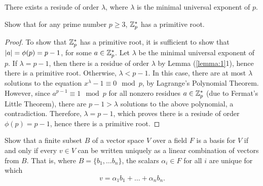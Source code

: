 \documentclass[11pt]{article}
\begin{document}
\begin{lemma}{1} \label{lemma:1}
There exists a resiude of order $ \lambda $, where $ \lambda $ is the minimal universal exponent of $ p $.
\end{lemma}

\begin{exercise}{2}
Show that for any prime number $ p \geq 3 $, $ \mathbb{Z}_{p}^{*} $ has a primitive root.
\end{exercise}

\begin{proof}
To show that $ \mathbb{Z}_{p}^{*} $ has a primitive root, it is sufficient to show that $ |a| = \phi(p) = p-1 $, for some $ a \in \mathbb{Z}_{p}^{*} $. Let $ \lambda $ be the minimal universal exponent of $ p $. If $ \lambda = p-1 $, then there is a residue of order $ \lambda $ by Lemma (\ref{lemma:1}1), hence there is a primitive root. Otherwise, $ \lambda < p-1 $. In this case, there are at most $ \lambda $ solutions to the equation $ x^{\lambda} - 1 \equiv 0 \mod p$, by Lagrange's Polynomial Theorem. However, since $ a^{p-1} \equiv 1 \mod p $ for all nonzero residues $ a \in \mathbb{Z}_{p}^{*} $ (due to Fermat's Little Theorem), there are $ p-1 > \lambda$ solutions to the above polynomial, a contradiction. Therefore, $ \lambda = p - 1 $, which proves there is a resiude of order $ \phi(p) = p -1 $, hence there is a primitive root.

\end{proof}

\begin{exercise}{3}
Show that a finite subset $ B $ of a vector space $ V $ over a field $ F $ is a basis for $ V $ if and only if every $ v \in V $ can be written uniquely as a linear combination of vectors from $ B $. That is, where $ B = \{b_{1}, \ldots b_{n}\} $, the scalars $ \alpha_{i} \in F $ for all $ i $ are unique for which
\[ v = \alpha_{1} b_{1} + \ldots + \alpha_{n} b_{n}. \]

\end{exercise}
\end{document}
